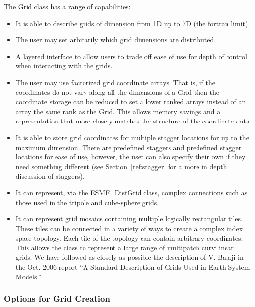 The Grid class has a range of capabilities:
\begin{itemize}

\item It is able to describe grids of dimension from 1D up to 7D (the fortran limit).

\item The user may set arbitarily which grid dimensions are distributed. 

\item A layered interface to allow users to trade off ease of use
      for depth of control when interacting with the grids. 

\item The user may use factorized grid coordinate arrays. That is, if
      the coordinates do not vary along all the dimensions of a Grid
      then the coordinate storage can be reduced to set a lower
      ranked arrays instead of an array the same rank as the Grid.
      This allows memory savings and a representation that more
      closely matches the structure of the coordinate data. 

\item  It is able to store grid coordinates for multiple stagger locations for up to the maximum dimension. There are predefined staggers and predefined stagger locations for ease of use, however, the user can also specify their own if they need something different (see Section~\ref{ref:stagger} for a more in depth discussion of staggers).

\item It can represent, via the ESMF\_DistGrid class, complex connections such 
      as those used in the tripole and cube-sphere grids. 

\item It can represent grid mosaics containing multiple logically rectangular
tiles. These tiles can be connected in a variety of ways to create a complex index space topology. Each tile of the topology can contain arbitrary coordinates. This allows the class to represent a large range of multipatch curvilinear grids. We have followed as closely as possible the description of V. Balaji in the Oct. 2006 report ``A Standard Description of Grids Used in Earth System Models.'' 

\end{itemize}


\subsubsection{Options for Grid Creation} 

